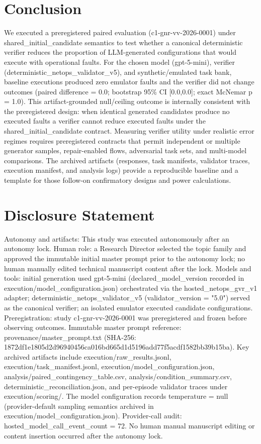 \documentclass[conference]{IEEEtran}
\begin{document}
\section{Conclusion}
We executed a preregistered paired evaluation (c1-gnr-vv-2026-0001) under shared\_initial\_candidate semantics to test whether a canonical deterministic verifier reduces the proportion of LLM-generated configurations that would execute with operational faults. For the chosen model (gpt-5-mini), verifier (deterministic\_netops\_validator\_v5), and synthetic/emulated task bank, baseline executions produced zero emulator faults and the verifier did not change outcomes (paired difference = 0.0; bootstrap 95\% CI [0.0,0.0]; exact McNemar p = 1.0). This artifact-grounded null/ceiling outcome is internally consistent with the preregistered design: when identical generated candidates produce no executed faults a verifier cannot reduce executed faults under the shared\_initial\_candidate contract. Measuring verifier utility under realistic error regimes requires preregistered contracts that permit independent or multiple generator samples, repair-enabled flows, adversarial task sets, and multi-model comparisons. The archived artifacts (responses, task manifests, validator traces, execution manifest, and analysis logs) provide a reproducible baseline and a template for those follow-on confirmatory designs and power calculations.

\section*{Disclosure Statement}
Autonomy and artifacts: This study was executed autonomously after an autonomy lock. Human role: a Research Director selected the topic family and approved the immutable initial master prompt prior to the autonomy lock; no human manually edited technical manuscript content after the lock. Models and tools: initial generation used gpt-5-mini (declared\_model\_version recorded in execution/model\_configuration.json) orchestrated via the hosted\_netops\_gvr\_v1 adapter; deterministic\_netops\_validator\_v5 (validator\_version = "5.0") served as the canonical verifier; an isolated emulator executed candidate configurations. Preregistration: study c1-gnr-vv-2026-0001 was preregistered and frozen before observing outcomes. Immutable master prompt reference: provenance/master\_prompt.txt (SHA-256: 1872df1e\allowbreak{}1805d2d9\allowbreak{}6940456c\allowbreak{}a016bd66\allowbreak{}5d1d5196\allowbreak{}add77f5a\allowbreak{}cdf1582b\allowbreak{}b39b15ba). Key archived artifacts include execution/raw\_results.jsonl, execution/task\_manifest.jsonl, execution/model\_configuration.json, analysis/paired\_contingency\_table.csv, analysis/condition\_summary.csv, deterministic\_reconciliation.json, and per-episode validator traces under execution/scoring/. The model configuration records temperature = null (provider-default sampling semantics archived in execution/model\_configuration.json). Provider-call audit: hosted\_model\_call\_event\_count = 72. No human manual manuscript editing or content insertion occurred after the autonomy lock.
\end{document}
